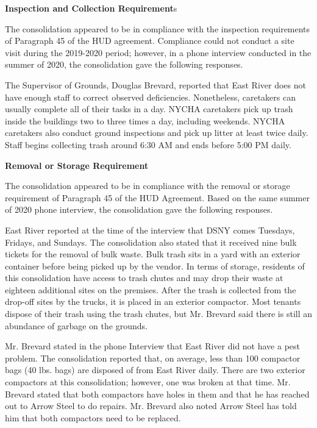 
\textbf{Inspection and Collection Requirement}s

The consolidation appeared to be in compliance with the inspection requirements of Paragraph 45 of the HUD agreement. Compliance could not conduct a site visit during the 2019-2020 period; however, in a phone interview conducted in the summer of 2020, the consolidation gave the following responses.

The Supervisor of Grounds, Douglas Brevard, reported that East River does not have enough staff to correct observed deficiencies. Nonetheless, caretakers can usually complete all of their tasks in a day. NYCHA caretakers pick up trash inside the buildings two to three times a day, including weekends. NYCHA caretakers also conduct ground inspections and pick up litter at least twice daily. Staff begins collecting trash around 6:30 AM and ends before 5:00 PM daily.



\textbf{Removal or Storage Requirement}

The consolidation appeared to be in compliance with the removal or storage requirement of Paragraph  45 of the HUD Agreement. Based on the same summer of  2020 phone interview, the consolidation gave the following responses.



East River reported at the time of the interview that DSNY comes Tuesdays, Fridays, and Sundays. The consolidation also stated that it received nine bulk tickets for the removal of bulk waste. Bulk trash sits in a yard with an exterior container before being picked up by the vendor. In terms of storage, residents of this consolidation have access to trash chutes and may drop their waste at eighteen additional sites on the premises. After the trash is collected from the drop-off sites by the trucks, it is placed in an exterior compactor. Most tenants dispose of their trash using the trash chutes, but Mr. Brevard said there is still an abundance of garbage on the grounds. 



Mr. Brevard stated in the phone Interview that East River did not have a pest problem. The consolidation reported that, on average, less than 100 compactor bags (40 lbs. bags) are disposed of from East River daily. There are two exterior compactors at this consolidation; however, one was broken at that time.  Mr. Brevard stated that both compactors have holes in them and that he has reached out to Arrow Steel to do repairs. Mr. Brevard also noted Arrow Steel has told him that both compactors need to be replaced. 

